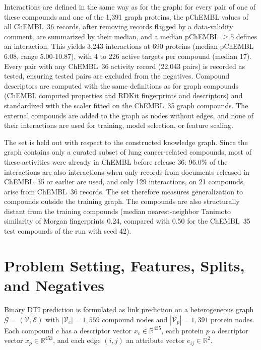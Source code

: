 \documentclass[11pt,letterpaper]{article}
\begin{document}
Interactions are defined in the same way as for the graph: for every pair of one of these compounds and one of the 1,391 graph proteins, the pChEMBL values of all ChEMBL~36 records, after removing records flagged by a data-validity comment, are summarized by their median, and a median pChEMBL $\geq 5$ defines an interaction. This yields 3,243 interactions at 690 proteins (median pChEMBL 6.08, range 5.00-10.87), with 4 to 226 active targets per compound (median 17). Every pair with any ChEMBL~36 activity record (22,043 pairs) is recorded as tested, ensuring tested pairs are excluded from the negatives. Compound descriptors are computed with the same definitions as for graph compounds (ChEMBL computed properties and RDKit fingerprints and descriptors) and standardized with the scaler fitted on the ChEMBL~35 graph compounds. The external compounds are added to the graph as nodes without edges, and none of their interactions are used for training, model selection, or feature scaling.

The set is held out with respect to the constructed knowledge graph. Since the graph contains only a curated subset of lung cancer-related compounds, most of these activities were already in ChEMBL before release 36: 96.0\% of the interactions are also interactions when only records from documents released in ChEMBL~35 or earlier are used, and only 129 interactions, on 21 compounds, arise from ChEMBL~36 records. The set therefore measures generalization to compounds outside the training graph. The compounds are also structurally distant from the training compounds (median nearest-neighbor Tanimoto similarity of Morgan fingerprints 0.24, compared with 0.50 for the ChEMBL~35 test compounds of the run with seed 42).

\section{Problem Setting, Features, Splits, and Negatives}
\label{app:setting}
Binary DTI prediction is formulated as link prediction on a heterogeneous graph $\mathcal{G}=(\mathcal{V},\mathcal{E})$ with $|\mathcal{V}_c|=1{,}559$ compound nodes and $|\mathcal{V}_p|=1{,}391$ protein nodes. Each compound $c$ has a descriptor vector $x_c\in\mathbb{R}^{435}$, each protein $p$ a descriptor vector $x_p\in\mathbb{R}^{453}$, and each edge $(i,j)$ an attribute vector $e_{ij}\in\mathbb{R}^{2}$.
\end{document}

